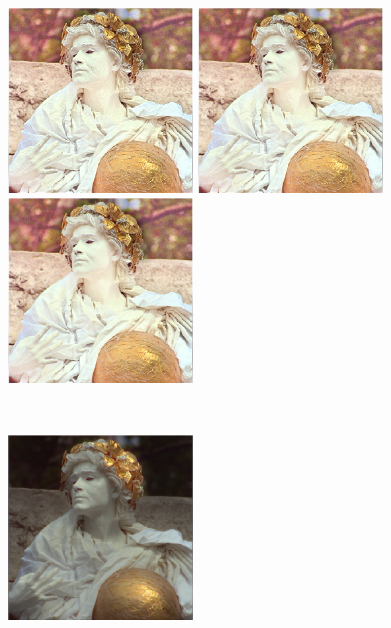 \begin{figure}[htbp]
\centering
	\begin{minipage}[b]{0.32\hsize}
	\centering
	\includegraphics[width=49mm, height = 49mm]{images/norm_p/reflectance/p06.eps}
	\end{minipage}
	\begin{minipage}[b]{0.32\hsize}
	\centering
	\includegraphics[width=49mm, height = 49mm]{images/norm_p/reflectance/p10.eps}
	\end{minipage}
	\begin{minipage}[b]{0.32\hsize}
	\centering
	\includegraphics[width=49mm, height = 49mm]{images/norm_p/reflectance/p20.eps}
	\end{minipage}\\
	\vspace{1.5mm}
	\begin{minipage}[b]{0.32\hsize}
	\centering
	\includegraphics[width=49mm, height = 49mm]{images/norm_p/illumination/p06.eps}

\end{minipage}
\end{figure}
